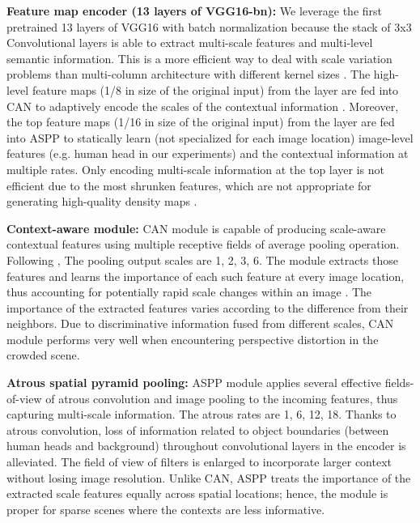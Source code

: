 \documentclass[10pt, conference, a4paper]{IEEEtran}
\begin{document}
\textbf{Feature map encoder (13 layers of VGG16-bn):} We leverage the first pretrained 13 layers of VGG16 with batch normalization because the stack of 3x3 Convolutional layers is able to extract multi-scale features and multi-level semantic information. This is a more efficient way to deal with scale variation problems than multi-column architecture with different kernel sizes \cite{li2018csrnet}. The high-level feature maps (1/8 in size of the original input) from the  layer are fed into CAN to adaptively encode the scales of the contextual information \cite{liu2019context}. Moreover, the top feature maps (1/16 in size of the original input) from the  layer are fed into ASPP to statically learn (not specialized for each image location) image-level features (e.g. human head in our experiments) and the contextual information at multiple rates. Only encoding multi-scale information at the top layer is not efficient due to the most shrunken features, which are not appropriate for generating high-quality density maps \cite{li2018csrnet}.

\textbf{Context-aware module:} CAN \cite{liu2019context} module is capable of producing scale-aware contextual features using multiple receptive fields of average pooling operation. Following \cite{liu2019context}, The pooling output scales are 1, 2, 3, 6. The module extracts those features and learns the importance of each such feature at every image location, thus accounting for potentially rapid scale changes within an image \cite{liu2019context}. The importance of the extracted features varies according to the difference from their neighbors. Due to discriminative information fused from different scales, CAN module performs very well when encountering perspective distortion in the crowded scene.

\textbf{Atrous spatial pyramid pooling:} ASPP \cite{chen2017deeplab} module applies several effective fields-of-view of atrous convolution and image pooling to the incoming features, thus capturing multi-scale information. The atrous rates are 1, 6, 12, 18. Thanks to atrous convolution, loss of information related to object boundaries (between human heads and background) throughout convolutional layers in the encoder is alleviated. The field of view of filters is enlarged to incorporate larger context without losing image resolution. Unlike CAN, ASPP treats the importance of the extracted scale features equally across spatial locations; hence, the module is proper for sparse scenes where the contexts are less informative.
\end{document}
